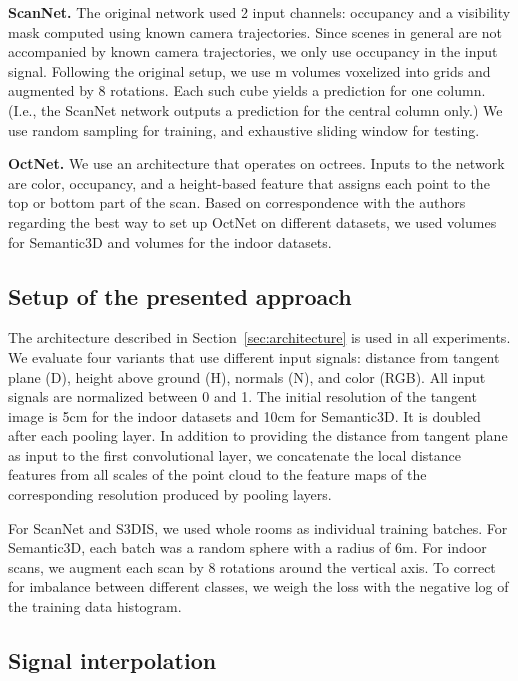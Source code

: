 \documentclass[10pt,twocolumn,letterpaper]{article}
\newcommand\mypara[1]{\vspace{1mm}\noindent\textbf{#1}}
\begin{document}
\mypara{ScanNet.} The original network used 2 input channels: occupancy and a visibility mask computed using known camera trajectories. Since scenes in general are not accompanied by known camera trajectories, we only use occupancy in the input signal. Following the original setup, we use m volumes voxelized into  grids and augmented by 8 rotations.
Each such cube yields a prediction for one  column. (I.e., the ScanNet network outputs a prediction for the central column only.) We use random sampling for training, and exhaustive sliding window for testing.

\mypara{OctNet.}
We use an architecture that operates on  octrees.
Inputs to the network are color, occupancy, and a height-based feature that assigns each point to the top or bottom part of the scan.
Based on correspondence with the authors regarding the best way to set up OctNet on different datasets, we used  volumes for Semantic3D and  volumes for the indoor datasets.


\subsection{Setup of the presented approach}

The architecture described in Section~\ref{sec:architecture} is used in all experiments.
We evaluate four variants that use different input signals: distance from tangent plane (D), height above ground (H), normals (N), and color (RGB).
All input signals are normalized between 0 and 1.
The initial resolution  of the tangent image is 5cm for the indoor datasets and 10cm for Semantic3D.
It is doubled after each pooling layer.
In addition to providing the distance from tangent plane as input to the first convolutional layer, we concatenate the local distance features from all scales of the point cloud to the feature maps of the corresponding resolution produced by pooling layers.

For ScanNet and S3DIS, we used whole rooms as individual training batches.
For Semantic3D, each batch was a random sphere with a radius of 6m.
For indoor scans, we augment each scan by 8 rotations around the vertical axis.
To correct for imbalance between different classes, we weigh the loss with the negative log of the training data histogram.

\subsection{Signal interpolation}
\end{document}
